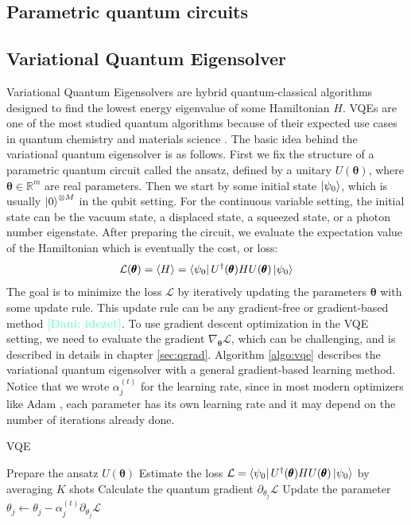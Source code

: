 \documentclass[12pt, a4paper,  nobibnotes]{article}
\newcommand{\nd}[1]{\textcolor{Aquamarine}{\textbf{[Dani: #1]}}}
\begin{document}
\subsection{Parametric quantum circuits}
\subsection{Variational Quantum Eigensolver}
\label{sec:vqe}
Variational Quantum Eigensolvers \cite{Peruzzo2014} are hybrid quantum-classical algorithms designed to find the lowest energy eigenvalue of some Hamiltonian $H$. VQEs are one of the most studied quantum algorithms because of their expected use cases in quantum chemistry and
materials science \cite{Wei2020-QCHEM,VQE-HARTREE-FOCK,Kandala2017-VQE-QCHEM,PhysRevX-VQE-QCHEM}.
The basic idea behind the variational quantum eigensolver is as follows. 
First we fix the structure of a parametric quantum circuit called the ansatz, defined by a 
unitary $U(\pmb\theta)$, where $\pmb\theta\in\mathbb{R}^m$ are real parameters. 
Then we start by some initial state $\ket{\psi_0}$, which is usually $\ket 0^{\otimes M}$ 
in the qubit setting. For the continuous variable setting, the initial state can be the vacuum state,
a displaced state, a squeezed state, or a photon number eigenstate.
After preparing the circuit, we evaluate the expectation value of the Hamiltonian
which is eventually the cost, or loss:
\begin{equation}
    \mathcal L(\pmb\theta) = \langle H \rangle = \bra{\psi_0}U^{\dagger}(\pmb\theta)HU(\pmb\theta)\ket{\psi_0}
\end{equation}
The goal is to minimize the loss $\mathcal L$ by iteratively updating the parameters $\pmb\theta$ with some update rule. This update rule can be any gradient-free \cite{Zhu2019} or gradient-based method \nd{idezet}. To use gradient descent optimization in the VQE setting, we need to evaluate the gradient
$\nabla_{\pmb\theta}\mathcal L$, which can be challenging, and is described in details in chapter \ref{sec:qgrad}. Algorithm \ref{algo:vqe} describes 
the variational quantum eigensolver with a general gradient-based learning method. Notice that we wrote $\alpha_j^{(t)}$ for the learning rate, since in most modern optimizers like Adam \cite{Kingma2015AdamAM}, each parameter has its own learning rate and it may depend on the number of iterations already done.
\begin{algorithm}[H]
    \caption{VQE}
    \begin{algorithmic}[1]
            \State Prepare the ansatz $U(\pmb\theta)$
            \State Estimate the loss $\mathcal L = \bra{\psi_0}U^{\dagger}(\pmb\theta)HU(\pmb\theta)\ket{\psi_0}$ by averaging $K$ shots
                \State Calculate the quantum gradient $\partial_{\theta_j}\mathcal L$
                \State Update the parameter $\theta_j \leftarrow \theta_j - \alpha_j^{(t)}\partial_{\theta_j}\mathcal L$
            \EndFor
        \EndFor
    \EndProcedure
    \end{algorithmic}
    \label{algo:vqe}
\end{algorithm}
\end{document}

